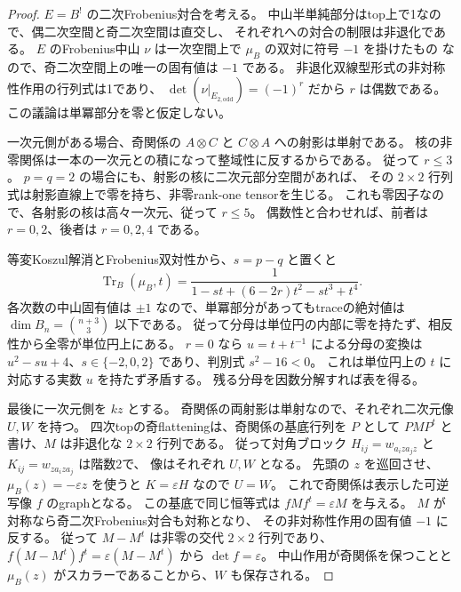 \begin{proof}
$E=B^!$ の二次Frobenius対合を考える。
中山半単純部分はtop上で1なので、偶二次空間と奇二次空間は直交し、
それぞれへの対合の制限は非退化である。
$E$ のFrobenius中山 $\nu$ は一次空間上で $\mu_B$ の双対に符号 $-1$ を掛けたもの
\cite[Theorem 6.3の証明]{RRZ}なので、奇二次空間上の唯一の固有値は $-1$ である。
非退化双線型形式の非対称性作用の行列式は1であり、
$\det(\nu|_{E_{2,\mathrm{odd}}})=(-1)^r$ だから $r$ は偶数である。
この議論は単冪部分を零と仮定しない。

一次元側がある場合、奇関係の $A\otimes C$ と $C\otimes A$ への射影は単射である。
核の非零関係は一本の一次元との積になって整域性に反するからである。
従って $r\le3$。
$p=q=2$ の場合にも、射影の核に二次元部分空間があれば、
その $2\times2$ 行列式は射影直線上で零を持ち、非零rank-one tensorを生じる。
これも零因子なので、各射影の核は高々一次元、従って $r\le5$。
偶数性と合わせれば、前者は $r=0,2$、後者は $r=0,2,4$ である。

等変Koszul解消とFrobenius双対性から、$s=p-q$ と置くと
\[
 \operatorname{Tr}_B(\mu_B,t)
 =\frac1{1-st+(6-2r)t^2-st^3+t^4}.
\]
各次数の中山固有値は $\pm1$ なので、単冪部分があってもtraceの絶対値は
$\dim B_n=\binom{n+3}{3}$ 以下である。
従って分母は単位円の内部に零を持たず、相反性から全零が単位円上にある。
$r=0$ なら $u=t+t^{-1}$ による分母の変換は
$u^2-su+4$、$s\in\{-2,0,2\}$ であり、判別式 $s^2-16<0$。
これは単位円上の $t$ に対応する実数 $u$ を持たず矛盾する。
残る分母を因数分解すれば表を得る。

最後に一次元側を $kz$ とする。
奇関係の両射影は単射なので、それぞれ二次元像 $U,W$ を持つ。
四次topの奇flatteningは、奇関係の基底行列を $P$ として
$PMP^t$ と書け、$M$ は非退化な $2\times2$ 行列である。
従って対角ブロック
$H_{ij}=w_{a_i z a_j z}$ と $K_{ij}=w_{z a_i z a_j}$ は階数2で、
像はそれぞれ $U,W$ となる。
先頭の $z$ を巡回させ、$\mu_B(z)=-\varepsilon z$ を使うと
$K=\varepsilon H$ なので $U=W$。
これで奇関係は表示した可逆写像 $f$ のgraphとなる。
この基底で同じ恒等式は $fMf^t=\varepsilon M$ を与える。
$M$ が対称なら奇二次Frobenius対合も対称となり、
その非対称性作用の固有値 $-1$ に反する。
従って $M-M^t$ は非零の交代 $2\times2$ 行列であり、
$f(M-M^t)f^t=\varepsilon(M-M^t)$ から $\det f=\varepsilon$。
中山作用が奇関係を保つことと $\mu_B(z)$ がスカラーであることから、$W$ も保存される。
\end{proof}

